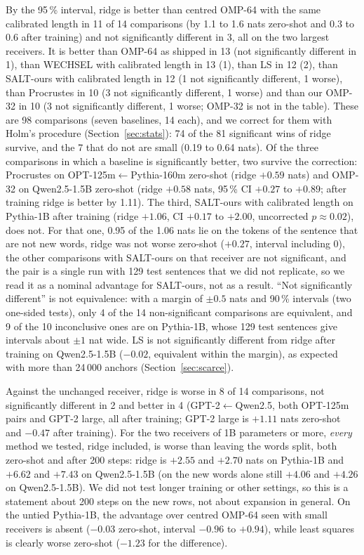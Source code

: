 \documentclass[preprint,12pt]{elsarticle}
\begin{document}
By the 95\,\% interval, ridge is better than centred OMP-64 with the same calibrated length in 11 of 14 comparisons (by 1.1 to 1.6 nats zero-shot and 0.3 to 0.6 after training) and not significantly different in 3, all on the two largest receivers. It is better than OMP-64 as shipped in 13 (not significantly different in 1), than WECHSEL with calibrated length in 13 (1), than LS in 12 (2), than SALT-ours with calibrated length in 12 (1 not significantly different, 1 worse), than Procrustes in 10 (3 not significantly different, 1 worse) and than our OMP-32 in 10 (3 not significantly different, 1 worse; OMP-32 is not in the table). These are 98 comparisons (seven baselines, 14 each), and we correct for them with Holm's procedure (Section~\ref{sec:stats}): 74 of the 81 significant wins of ridge survive, and the 7 that do not are small (0.19 to 0.64 nats). Of the three comparisons in which a baseline is significantly better, two survive the correction: Procrustes on OPT-125m$\leftarrow$Pythia-160m zero-shot (ridge $+0.59$ nats) and OMP-32 on Qwen2.5-1.5B zero-shot (ridge $+0.58$ nats, 95\,\% CI $+0.27$ to $+0.89$; after training ridge is better by 1.11). The third, SALT-ours with calibrated length on Pythia-1B after training (ridge $+1.06$, CI $+0.17$ to $+2.00$, uncorrected $p\approx0.02$), does not. For that one, 0.95 of the 1.06 nats lie on the tokens of the sentence that are not new words, ridge was not worse zero-shot ($+0.27$, interval including 0), the other comparisons with SALT-ours on that receiver are not significant, and the pair is a single run with 129 test sentences that we did not replicate, so we read it as a nominal advantage for SALT-ours, not as a result. ``Not significantly different'' is not equivalence: with a margin of $\pm0.5$ nats and 90\,\% intervals (two one-sided tests), only 4 of the 14 non-significant comparisons are equivalent, and 9 of the 10 inconclusive ones are on Pythia-1B, whose 129 test sentences give intervals about $\pm1$ nat wide. LS is not significantly different from ridge after training on Qwen2.5-1.5B ($-0.02$, equivalent within the margin), as expected with more than 24\,000 anchors (Section~\ref{sec:scarce}).

Against the unchanged receiver, ridge is worse in 8 of 14 comparisons, not significantly different in 2 and better in 4 (GPT-2$\leftarrow$Qwen2.5, both OPT-125m pairs and GPT-2 large, all after training; GPT-2 large is $+1.11$ nats zero-shot and $-0.47$ after training). For the two receivers of 1B parameters or more, \emph{every} method we tested, ridge included, is worse than leaving the words split, both zero-shot and after 200 steps: ridge is $+2.55$ and $+2.70$ nats on Pythia-1B and $+6.62$ and $+7.43$ on Qwen2.5-1.5B (on the new words alone still $+4.06$ and $+4.26$ on Qwen2.5-1.5B). We did not test longer training or other settings, so this is a statement about 200 steps on the new rows, not about expansion in general. On the untied Pythia-1B, the advantage over centred OMP-64 seen with small receivers is absent ($-0.03$ zero-shot, interval $-0.96$ to $+0.94$), while least squares is clearly worse zero-shot ($-1.23$ for the difference).
\end{document}
